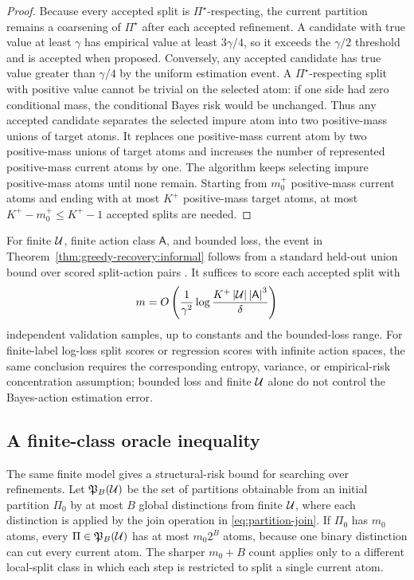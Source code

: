 \begin{proof}
Because every accepted split is $\Pi^\star$-respecting, the current partition remains a coarsening of $\Pi^\star$ after each accepted refinement. A candidate with true value at least $\gamma$ has empirical value at least $3\gamma/4$, so it exceeds the $\gamma/2$ threshold and is accepted when proposed. Conversely, any accepted candidate has true value greater than $\gamma/4$ by the uniform estimation event. A $\Pi^\star$-respecting split with positive value cannot be trivial on the selected atom: if one side had zero conditional mass, the conditional Bayes risk would be unchanged. Thus any accepted candidate separates the selected impure atom into two positive-mass unions of target atoms. It replaces one positive-mass current atom by two positive-mass unions of target atoms and increases the number of represented positive-mass current atoms by one. The algorithm keeps selecting impure positive-mass atoms until none remain. Starting from $m_0^+$ positive-mass current atoms and ending with at most $K^+$ positive-mass target atoms, at most $K^+-m_0^+\le K^+-1$ accepted splits are needed.
\end{proof}

For finite $\mathcal{U}$, finite action class $\mathsf A$, and bounded loss, the event in Theorem~\ref{thm:greedy-recovery:informal} follows from a standard held-out union bound over scored split-action pairs \citep{hoeffding1963probability,devroye1996probabilistic}. It suffices to score each accepted split with
\begin{align*}
m
=
O\left(
\frac{1}{\gamma^2}
\log\frac{K^+\left\lvert\mathcal{U}\right\rvert\left\lvert\mathsf A\right\rvert^3}{\delta}
\right)
\end{align*}
independent validation samples, up to constants and the bounded-loss range. For finite-label log-loss split scores or regression scores with infinite action spaces, the same conclusion requires the corresponding entropy, variance, or empirical-risk concentration assumption; bounded loss and finite $\mathcal{U}$ alone do not control the Bayes-action estimation error.

\subsection{A finite-class oracle inequality}

The same finite model gives a structural-risk bound for searching over refinements. Let $\mathfrak P_B(\mathcal{U})$ be the set of partitions obtainable from an initial partition $\Pi_0$ by at most $B$ global distinctions from finite $\mathcal{U}$, where each distinction is applied by the join operation in \eqref{eq:partition-join}. If $\Pi_0$ has $m_0$ atoms, every $\Pi\in\mathfrak P_B(\mathcal{U})$ has at most $m_0 2^B$ atoms, because one binary distinction can cut every current atom. The sharper $m_0+B$ count applies only to a different local-split class in which each step is restricted to split a single current atom.

